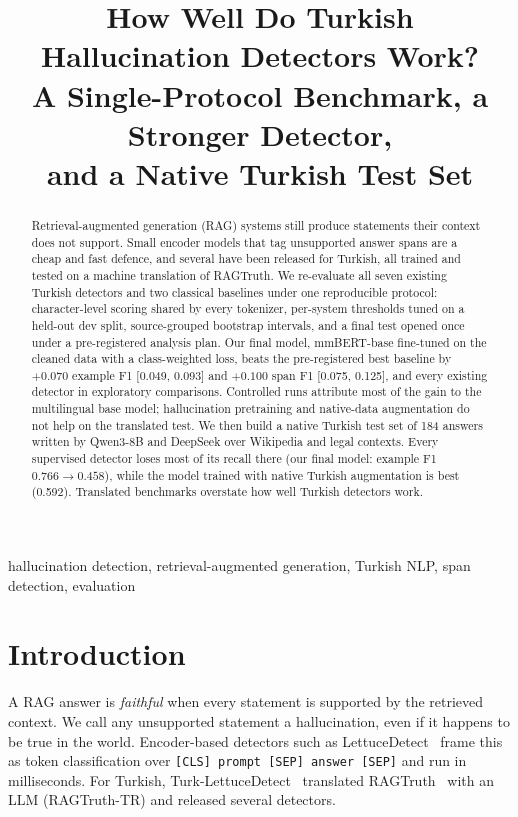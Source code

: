 \documentclass[conference,a4paper]{IEEEtran}
\begin{document}
\title{How Well Do Turkish Hallucination Detectors Work?\\ A Single-Protocol Benchmark, a Stronger Detector,\\ and a Native Turkish Test Set}

\author{
}

\maketitle

\begin{abstract}
Retrieval-augmented generation (RAG) systems still produce statements their context does not support. Small encoder models that tag unsupported answer spans are a cheap and fast defence, and several have been released for Turkish, all trained and tested on a machine translation of RAGTruth. We re-evaluate all seven existing Turkish detectors and two classical baselines under one reproducible protocol: character-level scoring shared by every tokenizer, per-system thresholds tuned on a held-out dev split, source-grouped bootstrap intervals, and a final test opened once under a pre-registered analysis plan. Our final model, mmBERT-base fine-tuned on the cleaned data with a class-weighted loss, beats the pre-registered best baseline by $+0.070$ example F1 [0.049, 0.093] and $+0.100$ span F1 [0.075, 0.125], and every existing detector in exploratory comparisons. Controlled runs attribute most of the gain to the multilingual base model; hallucination pretraining and native-data augmentation do not help on the translated test. We then build a native Turkish test set of 184 answers written by Qwen3-8B and DeepSeek over Wikipedia and legal contexts. Every supervised detector loses most of its recall there (our final model: example F1 $0.766 \rightarrow 0.458$), while the model trained with native Turkish augmentation is best (0.592). Translated benchmarks overstate how well Turkish detectors work.
\end{abstract}

\begin{IEEEkeywords}
hallucination detection, retrieval-augmented generation, Turkish NLP, span detection, evaluation
\end{IEEEkeywords}

\section{Introduction}
A RAG answer is \emph{faithful} when every statement is supported by the retrieved context. We call any unsupported statement a hallucination, even if it happens to be true in the world. Encoder-based detectors such as LettuceDetect~\cite{kovacs2025lettucedetect} frame this as token classification over \texttt{[CLS] prompt [SEP] answer [SEP]} and run in milliseconds. For Turkish, Turk-LettuceDetect~\cite{tas2025turk} translated RAGTruth~\cite{niu2024ragtruth} with an LLM (RAGTruth-TR) and released several detectors.
\end{document}
